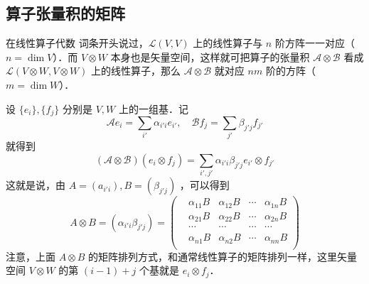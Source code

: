 \subsection{算子张量积的矩阵}
在线性算子代数 词条开头说过，$\mathcal L(V,V)$ 上的线性算子与 $n$ 阶方阵一一对应（ $n=\dim V$）．而 $V\otimes W$ 本身也是矢量空间，这样就可把算子的张量积 $\mathcal A\otimes \mathcal B$ 看成 $\mathcal L(V\otimes W,V\otimes W)$ 上的线性算子，那么 $\mathcal A\otimes \mathcal B$ 就对应 $nm$ 阶的方阵（$m=\dim W$）．

设 $\{e_i\},\{f_j\}$ 分别是 $V,W$ 上的一组基．记
\begin{equation}
\mathcal Ae_i=\sum_{i'}\alpha_{i'i}e_{i'},\quad \mathcal Bf_j=\sum_{j'}\beta_{j'j}f_{j'}
\end{equation}
就得到
\begin{equation}
(\mathcal A\otimes \mathcal B)(e_i\otimes f_j)=\sum_{i',j'}\alpha_{i'i}\beta_{j'j}e_{i'}\otimes f_{j'}
\end{equation}
这就是说，由 $A=(a_{i'i}),B=(\beta_{j'j})$ ，可以得到
\begin{equation}
A\otimes B=(\alpha_{i'i}\beta_{j'j})=
\begin{pmatrix}
&\alpha_{11}B&\alpha_{12}B&\cdots&\alpha_{1n}B\\
&\alpha_{21}B&\alpha_{22}B&\cdots&\alpha_{2n}B\\
&\cdots&\cdots&\cdots&\cdots\\
&\alpha_{n1}B&\alpha_{n2}B&\cdots&\alpha_{nn}B\\
\end{pmatrix}
\end{equation}
注意，上面 $A\otimes B$ 的矩阵排列方式，和通常线性算子的矩阵排列一样，这里矢量空间 $V\otimes W$ 的第 $(i-1)+j$ 个基就是 $e_i\otimes f_j$．

